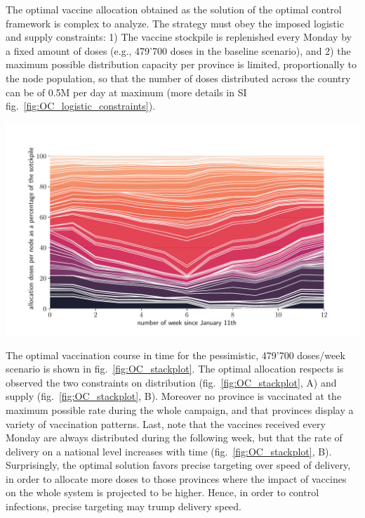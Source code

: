 The optimal vaccine allocation obtained as the solution of the optimal control framework is complex to analyze.%
The strategy must obey the imposed logistic and supply constraints: 1) The vaccine stockpile is replenished every Monday by a fixed amount of doses (e.g., 479'700 doses in the baseline scenario), and 2) the maximum possible distribution capacity per province is limited, proportionally to the node population, so that the number of doses distributed across the country can be of 0.5M per day at maximum (more details in SI fig.~\ref{fig:OC_logistic_constraints}). \begin{marginfigure}[-10\baselineskip]
    \centering
    \includegraphics{fig_italy-ocp/figuresSI/SI_ts_optimal_stackplot_proportional.pdf}
    \label{fig:OC_temporal_alloaction}
\end{marginfigure}

The optimal vaccination course in time for the pessimistic, 479'700 doses/week scenario is shown in fig.~\ref{fig:OC_stackplot}. The optimal allocation respects is observed the two constraints on distribution (fig.~\ref{fig:OC_stackplot}, A) and supply (fig.~\ref{fig:OC_stackplot}, B). Moreover no province is vaccinated at the maximum possible rate during the whole campaign, and that provinces display a variety of vaccination patterns. Last, note that the vaccines received every Monday are always distributed during the following week, but that the rate of delivery on a national level increases with time (fig.~\ref{fig:OC_stackplot}, B). Surprisingly, the optimal solution favors precise targeting over speed of delivery, in order to allocate more doses to those provinces where the impact of vaccines on the whole system is projected to be higher. Hence, in order to control infections, precise targeting may trump delivery speed. 

